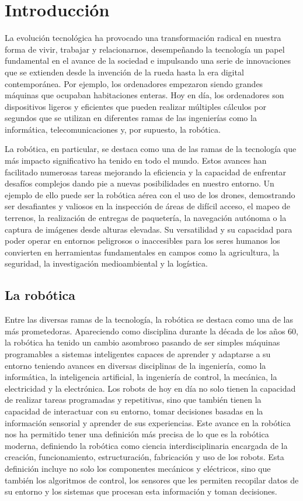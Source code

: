 \chapter{Introducción}
\label{cap:introduccion}
\setcounter{page}{1}

La evolución tecnológica ha provocado una transformación radical en nuestra forma de vivir, trabajar y relacionarnos, desempeñando la tecnología un papel 
fundamental en el avance de la sociedad e impulsando una serie de innovaciones que se extienden desde la invención de la rueda hasta la era digital contemporánea. 
Por ejemplo, los ordenadores empezaron siendo grandes máquinas que ocupaban habitaciones enteras. Hoy en día, los ordenadores
son dispositivos ligeros y eficientes que pueden realizar múltiples cálculos por segundos que se utilizan en diferentes ramas de las ingenierías como la informática, telecomunicaciones y,
por supuesto, la robótica.

La robótica, en particular, se destaca como una de las ramas de la tecnología que más impacto significativo ha tenido en todo el mundo. Estos avances han facilitado numerosas tareas mejorando la eficiencia 
y la capacidad de enfrentar desafíos complejos dando pie a nuevas posibilidades en nuestro entorno. Un ejemplo de ello puede ser la robótica aérea con el uso de los drones, 
demostrando ser desafiantes y valiosos en la inspección de áreas de difícil acceso, el mapeo de terrenos, la realización de entregas de paquetería, la navegación autónoma o la captura 
de imágenes desde alturas elevadas. Su versatilidad y su capacidad para poder operar en entornos peligrosos o inaccesibles para los seres humanos los convierten 
en herramientas fundamentales en campos como la agricultura, la seguridad, la investigación medioambiental y la logística. 

\section{La robótica}
\label{sec:enfoquesrobotica}
Entre las diversas ramas de la tecnología, la robótica se destaca como una de las más prometedoras. Apareciendo como disciplina durante la década de los años 60, 
la robótica ha tenido un cambio asombroso  pasando de ser simples máquinas programables a sistemas inteligentes capaces de aprender y adaptarse 
a su entorno teniendo avances en diversas disciplinas de la ingeniería, como la informática, la inteligencia artificial, la ingeniería de control, la mecánica, 
la electricidad y la electrónica. 
Los robots de hoy en día no solo tienen la capacidad de realizar tareas programadas y repetitivas, sino que también tienen la capacidad de interactuar con su entorno, 
tomar decisiones basadas en la información sensorial y aprender de sus experiencias. Este avance en la robótica nos ha permitido tener una definición más precisa de lo que es 
la robótica moderna, definiendo la robótica como ciencia interdisciplinaria encargada de la creación, funcionamiento, estructuración, fabricación y uso de los robots. 
Esta definición incluye no solo los componentes mecánicos y eléctricos, sino que también los algoritmos de control, los sensores que les permiten recopilar
datos de su entorno y los sistemas que procesan esta información y toman decisiones.

